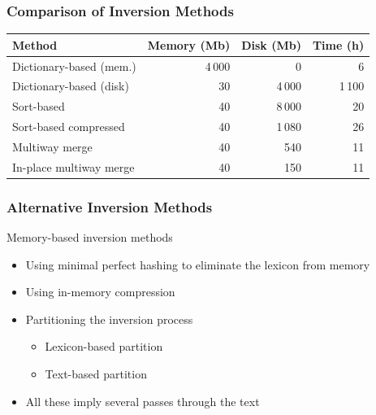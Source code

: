\documentclass[svgnames]{beamer}
\begin{document}
\begin{frame}
    \frametitle{Comparison of Inversion Methods}
    
    \begin{block}{}
        \centering
        \small
        \begin{tabular}{lrrr}
            Method & Memory (Mb) & Disk (Mb) & Time (h) \\\hline\hline
            Dictionary-based (mem.) & 4\,000 & 0 & 6 \\
            Dictionary-based (disk) & 30 & 4\,000 & 1\,100 \\
            Sort-based & 40 & 8\,000 & 20 \\
            Sort-based compressed & 40 & 1\,080 & 26 \\
            Multiway merge & 40 & 540 & 11 \\
            In-place multiway merge & 40 & 150 & 11 \\\hline
        \end{tabular}
    \end{block}
\end{frame}


\begin{frame}
    \frametitle{Alternative Inversion Methods}
    
    \begin{block}{Memory-based inversion methods}
        \begin{itemize}
        \item Using \alert{minimal perfect hashing} to eliminate the lexicon from
            memory
        \item Using in-memory compression
        \item Partitioning the inversion process
            \begin{itemize}
            \item Lexicon-based partition
            \item Text-based partition
            \end{itemize}
        \item All these imply several passes through the text
        \end{itemize}
    \end{block}
\end{frame}


\end{document}
